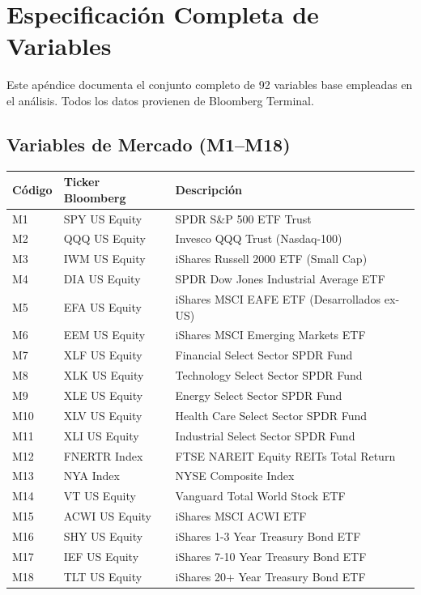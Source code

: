 \documentclass[11pt,a4paper]{article}
\begin{document}
\newpage
\appendix

\section{Especificación Completa de Variables}

Este apéndice documenta el conjunto completo de 92 variables base empleadas en el análisis. Todos los datos provienen de Bloomberg Terminal.

\subsection{Variables de Mercado (M1--M18)}

\small
\begin{longtable}{lp{3.5cm}p{7.5cm}}
\toprule
\textbf{Código} & \textbf{Ticker Bloomberg} & \textbf{Descripción} \\
\midrule
\endhead
M1 & SPY US Equity & SPDR S\&P 500 ETF Trust \\
M2 & QQQ US Equity & Invesco QQQ Trust (Nasdaq-100) \\
M3 & IWM US Equity & iShares Russell 2000 ETF (Small Cap) \\
M4 & DIA US Equity & SPDR Dow Jones Industrial Average ETF \\
M5 & EFA US Equity & iShares MSCI EAFE ETF (Desarrollados ex-US) \\
M6 & EEM US Equity & iShares MSCI Emerging Markets ETF \\
M7 & XLF US Equity & Financial Select Sector SPDR Fund \\
M8 & XLK US Equity & Technology Select Sector SPDR Fund \\
M9 & XLE US Equity & Energy Select Sector SPDR Fund \\
M10 & XLV US Equity & Health Care Select Sector SPDR Fund \\
M11 & XLI US Equity & Industrial Select Sector SPDR Fund \\
M12 & FNERTR Index & FTSE NAREIT Equity REITs Total Return \\
M13 & NYA Index & NYSE Composite Index \\
M14 & VT US Equity & Vanguard Total World Stock ETF \\
M15 & ACWI US Equity & iShares MSCI ACWI ETF \\
M16 & SHY US Equity & iShares 1-3 Year Treasury Bond ETF \\
M17 & IEF US Equity & iShares 7-10 Year Treasury Bond ETF \\
M18 & TLT US Equity & iShares 20+ Year Treasury Bond ETF \\
\bottomrule
\end{longtable}
\normalsize
\end{document}
